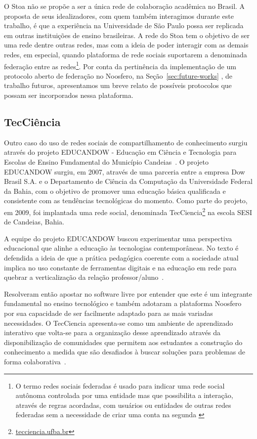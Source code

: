 O Stoa não se propõe a ser a única rede de colaboração acadêmica no Brasil. A
proposta de seus idealizadores, com quem também interagimos durante este trabalho,
é que a experiência na Universidade de São Paulo possa ser replicada em
outras instituições de ensino brasileiras.
%
A rede do Stoa tem o objetivo de ser uma rede dentre outras redes, mas com a ideia de poder
interagir com as demais redes, em especial, quando plataforma de rede sociais suportarem
a denominada federação entre as redes\footnote{O termo redes sociais federadas é usado 
para indicar uma rede social autônoma controlada por uma entidade mas que possibilita a
interação, através de regras acordadas, com usuários ou entidades de outras redes
federadas sem a necessidade de criar uma conta na segunda \cite{prodomou2010}}.
%
Por conta da pertinência da implementação de um protocolo aberto de federação no Noosfero,
na Seção~\ref{sec:future-works} , de trabalho futuros, apresentamos um breve relato de possíveis
protocolos que possam ser incorporados nessa plataforma.

\subsection{TecCiência}
\label{subsec:tecciencia}

Outro caso do uso de redes sociais de compartilhamento de conhecimento surgiu através do
projeto EDUCANDOW  - Educação em Ciência e Tecnologia para
Escolas de Ensino Fundamental do Município Candeias~\cite{santos2012}.
%
O projeto EDUCANDOW surgiu, em 2007, através de uma parceria entre a empresa
Dow Brasil S.A. e o Departamento de Ciência da Computação da Universidade Federal da Bahia,
com o objetivo de promover uma educação básica qualificada e consistente com as tendências tecnológicas
do momento.
%
Como parte do projeto, em 2009, foi implantada uma rede social, denominada TecCiencia\footnote{\url{tecciencia.ufba.br}}
na escola SESI de Candeias, Bahia.

A equipe do projeto EDUCANDOW buscou experimentar uma perspectiva educacional que
alinhe a educação às tecnologias contemporâneas.
%
No texto é defendida a ideia de que a prática pedagógica coerente com a sociedade atual
implica no uso constante de ferramentas digitais e na educação em rede para quebrar a
verticalização da relação professor/aluno~\cite{santos2012}.

Resolveram então apostar no software livre por entender que este é um integrante
fundamental no ensino tecnológico e também adotaram a plataforma Noosfero por sua
capacidade de ser facilmente adaptado para as mais variadas necessidades. O
TecCiencia apresenta-se como um ambiente de aprendizado interativo que volta-se
para a organização desse aprendizado através da disponibilização de comunidades
que permitem aos estudantes a construção do conhecimento a medida que são
desafiados à buscar soluções para problemas de forma colaborativa~\cite{santos2012}.

